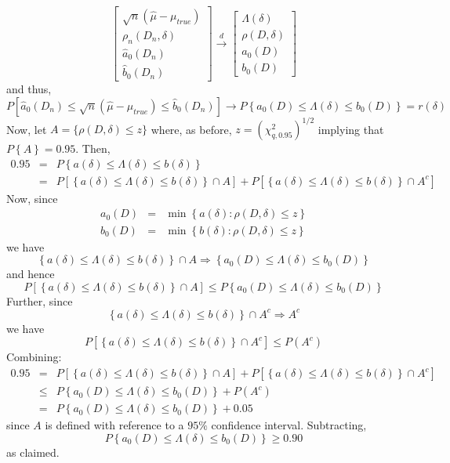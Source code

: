 	$$
	\left[\begin{array}{c}
		\sqrt{n}(\hat{\mu} - \mu_{true})\\
		\rho_n(D_n,\delta)\\
		\widehat{a}_0(D_n)\\
		\widehat{b}_0(D_n)
\end{array}\right] \overset{d}{\rightarrow}
		\left[\begin{array}{c}
		\Lambda(\delta)\\
		\rho(D,\delta)\\
		a_0(D)\\
		b_0(D)
\end{array}\right] 	
$$
and thus, 
	$$P\left[ \widehat{a}_0(D_n) \leq \sqrt{n}\left( \widehat{\mu}-\mu_{true}\right)\leq  \widehat{b}_0(D_n) \right] \rightarrow P\left\{ a_0(D) \leq \Lambda(\delta) \leq b_0(D)\right\} = r(\delta)$$
Now, let $A = \{  \rho(D,\delta)\leq z\}$ where, as before, $z = (\chi^2_{q,0.95})^{1/2}$ implying that $P\left\{A  \right\}=0.95$. Then,
	\begin{eqnarray*}
		0.95 &=& P\left\{a(\delta) \leq \Lambda(\delta) \leq b(\delta)  \right\}\\
			&=& P\left[\left\{a(\delta) \leq \Lambda(\delta) \leq b(\delta)  \right\}\cap A \right] + P\left[\left\{a(\delta) \leq \Lambda(\delta) \leq b(\delta)  \right\}\cap A^c \right] 
\end{eqnarray*}
Now, since
		\begin{eqnarray*}
		a_0(D)&=&\min \left\{a(\delta)\colon \rho(D, \delta) \leq z\right\}\\
		b_0(D)&=&\min \left\{b(\delta)\colon \rho(D, \delta) \leq z\right\}
\end{eqnarray*}
we have
$$\left\{a(\delta) \leq \Lambda(\delta) \leq b(\delta)  \right\}\cap A \Rightarrow \left\{a_0(D)  \leq \Lambda(\delta) \leq b_0(D)\right\}$$
and hence
	$$P\left[\left\{a(\delta) \leq \Lambda(\delta) \leq b(\delta)  \right\}\cap A \right]  \leq P\left\{a_0(D)  \leq \Lambda(\delta) \leq b_0(D)\right\}$$
Further, since
	$$\left\{a(\delta) \leq \Lambda(\delta) \leq b(\delta)  \right\}\cap A^c \Rightarrow A^c$$
we have
	$$P\left[\left\{a(\delta) \leq \Lambda(\delta) \leq b(\delta)  \right\}\cap A^c \right]  \leq P(A^c)$$
Combining:
		\begin{eqnarray*}
		0.95 &=& P\left[\left\{a(\delta) \leq \Lambda(\delta) \leq b(\delta)  \right\}\cap A \right] + P\left[\left\{a(\delta) \leq \Lambda(\delta) \leq b(\delta)  \right\}\cap A^c \right] \\
			&\leq&  P\left\{a_0(D)  \leq \Lambda(\delta) \leq b_0(D)\right\} + P(A^c)\\
			&=& P\left\{a_0(D)  \leq \Lambda(\delta) \leq b_0(D)\right\} + 0.05
\end{eqnarray*}
since $A$ is defined with reference to a $95\%$ confidence interval. Subtracting, 
	$$P\left\{a_0(D)  \leq \Lambda(\delta) \leq b_0(D)\right\} \geq 0.90$$
as claimed.

